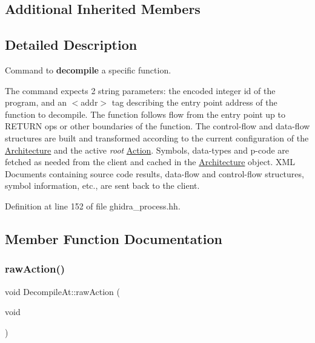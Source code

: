 \subsection*{Additional Inherited Members}


\subsection{Detailed Description}
Command to {\bfseries{decompile}} a specific function. 

The command expects 2 string parameters\+: the encoded integer id of the program, and an $<$addr$>$ tag describing the entry point address of the function to decompile. The function follows flow from the entry point up to R\+E\+T\+U\+RN ops or other boundaries of the function. The control-\/flow and data-\/flow structures are built and transformed according to the current configuration of the \mbox{\hyperlink{class_architecture}{Architecture}} and the active {\itshape root} \mbox{\hyperlink{class_action}{Action}}. Symbols, data-\/types and p-\/code are fetched as needed from the client and cached in the \mbox{\hyperlink{class_architecture}{Architecture}} object. X\+ML Documents containing source code results, data-\/flow and control-\/flow structures, symbol information, etc., are sent back to the client. 

Definition at line 152 of file ghidra\+\_\+process.\+hh.



\subsection{Member Function Documentation}
\mbox{\label{class_decompile_at_ae5dfee8a7e5fd8343f7cf59e53d4f78c}} 
\subsubsection{\texorpdfstring{rawAction()}{rawAction()}}
{\footnotesize\ttfamily void Decompile\+At\+::raw\+Action (\begin{DoxyParamCaption}\item[{void}]{ }\end{DoxyParamCaption})\hspace{0.3cm}{\ttfamily [virtual]}}



